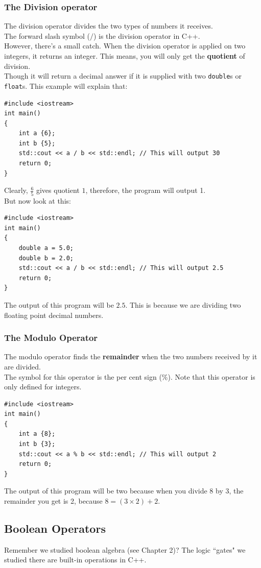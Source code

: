 \documentclass[letterpaper, 12pt]{book}
\begin{document}
\subsubsection{The Division operator}
The division operator divides the two types of numbers it receives.\\
The forward slash symbol ($/$) is the division operator in C++.\\
However, there's a small catch. When the division operator is applied on two integers, it returns an integer. This means, you will only get the \textbf{quotient} of division.\\
Though it will return a decimal answer if it is supplied with two \lstinline{double}s or \lstinline{float}s.
This example will explain that:
\begin{lstlisting}
#include <iostream>
int main()
{
	int a {6};
	int b {5};
	std::cout << a / b << std::endl; // This will output 30
	return 0;
}
\end{lstlisting}
Clearly, $\frac{6}{5}$ gives quotient $1$, therefore, the program will output 1.\\
But now look at this:
\begin{lstlisting}
#include <iostream>
int main()
{
	double a = 5.0;
	double b = 2.0;
	std::cout << a / b << std::endl; // This will output 2.5
	return 0;
}
\end{lstlisting}
The output of this program will be $2.5$. This is because we are dividing two floating point decimal numbers.
\subsubsection{The Modulo Operator}
The modulo operator finds the \textbf{remainder} when the two numbers received by it are divided.\\
The symbol for this operator is the per cent sign (\%). Note that this operator is only defined for integers.
\begin{lstlisting}
#include <iostream>
int main()
{
	int a {8};
	int b {3};
	std::cout << a % b << std::endl; // This will output 2
	return 0;
}
\end{lstlisting}
The output of this program will be two because when you divide 8 by 3, the remainder you get is 2, because $8 = (3 \times 2) + 2$.
\subsection{Boolean Operators}
Remember we studied boolean algebra (see Chapter 2)? The logic ``gates" we studied there are built-in operations in C++.
\end{document}
